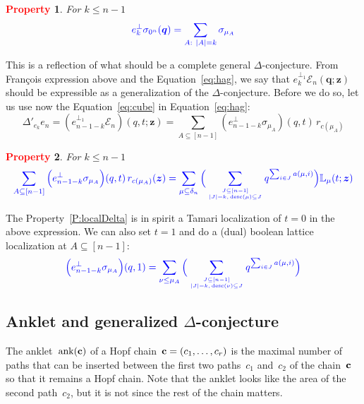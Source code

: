 \documentclass[12pt]{amsart}
\newcommand{\blue}[1]{\textcolor{blue}{#1}}
\newcommand{\red}[1]{\textcolor{red}{#1}}
\theoremstyle{plain}
\newtheorem{property}{\red{Property}}
\theoremstyle{definition}
\theoremstyle{remark}
\newcommand{\Qvar}{{\bm q}}
\newcommand{\Zvar}{{\bm z}}
\newcommand{\desc}{\mathop{\mathrm{desc}}}
\newcommand{\ank}{\mathop{\mathrm{ank}}}
\begin{document}
\begin{property}\label{P:DeltaAlt}
For $k\le n-1$
\[
\blue{e_k^\perp \sigma_{0^n}(\Qvar)  = \sum_{A:\  |A|=k} \sigma_{\mu_A}
}
\]
\end{property}

This is a reflection of what should be a complete general $\Delta$-conjecture.
From Fran\c{c}ois expression above and the Equation~\eqref{eq:hag}, we say that $e_{k}^{\perp_1}{\mathcal E}_n(\Qvar;\Zvar)$ should be expressible as a generalization of the $\Delta$-conjecture.
Before we do so, let us use 
now the Equation~\eqref{eq:cube} in Equation~\eqref{eq:hag}:
\begin{equation}\label{eq:deltacube}
\Delta'_{e_k} e_n = (e_{n-1-k}^{\perp_1}{\mathcal E}_n)(q,t;\Zvar)
= \sum_{A\subseteq [n-1]} ( e_{n-1-k}^\perp \sigma_{\mu_A} ) (q,t) \, r_{c(\mu_A)}
\end{equation}

\begin{property}\label{P:DeltaCube}
For $k\le n-1$
\[
\blue{
\sum_{A\subseteq [n-1]} \Big( e_{n-1-k}^\perp \sigma_{\mu_A} \Big) (q,t) \, r_{c(\mu_A)}(\Zvar)  = 
\sum_{\mu\subseteq\delta_n} \Big(\sum_{J\subseteq [n-1] \atop |J|=k, \,  \desc(\mu)\subseteq J} q^{\sum_{i\in J} a(\mu,i)}\Big) {\mathbb L}_\mu(t;\Zvar)
}
\]
\end{property}

The Property~\ref{P:localDelta} is in spirit a Tamari localization of $t=0$ in the above expression. We can also set $t=1$ and do a (dual) boolean lattice localization at $A\subseteq[n-1]$:
\begin{equation}\label{eq:cube_Delta_qt}
\blue{
\Big( e_{n-1-k}^\perp \sigma_{\mu_A} \Big) (q,1) = 
\sum_{\nu\le \mu_A} \Big(\sum_{J\subseteq [n-1] \atop |J|=k, \, \desc(\nu)\subseteq J} q^{\sum_{i\in J} a(\mu,i)}\Big)
}
\end{equation}

\subsection{Anklet and generalized $\Delta$-conjecture}

The anklet~$\ank({\bf c})$ of a Hopf chain~${\bf c} = (c_1, \dots, c_r)$ is the maximal number of paths that can be inserted between the first two paths~$c_1$ and~$c_2$ of the chain~${\bf c}$ so that it remains a Hopf chain.
Note that the anklet looks like the area of the second path~$c_2$, but it is not since the rest of the chain matters.
\end{document}

